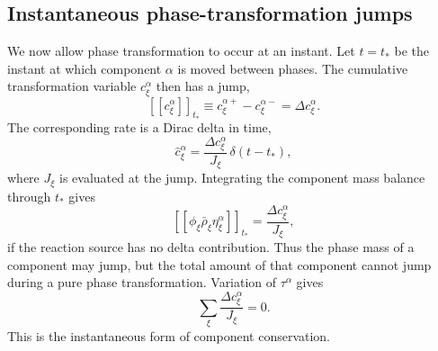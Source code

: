 \subsection{Instantaneous phase-transformation jumps}
\label{sec:instantaneous_c_jump}

We now allow phase transformation to occur at an instant.  Let $t=t_*$ be the
instant at which component $\alpha$ is moved between phases.  The cumulative
transformation variable $c_\xi^\alpha$ then has a jump,
\begin{equation}
  \left[\!\left[c_\xi^\alpha\right]\!\right]_{t_*}
  \equiv c_\xi^{\alpha +}-c_\xi^{\alpha -}
  = \Delta c_\xi^\alpha .
\end{equation}
The corresponding rate is a Dirac delta in time,
\begin{equation}
  \hat c_\xi^\alpha
  = \frac{\Delta c_\xi^\alpha}{J_\xi}\,\delta(t-t_*),
  \label{eq:chat_jump_decomp}
\end{equation}
where $J_\xi$ is evaluated at the jump.  Integrating the component mass balance
through $t_*$ gives
\begin{equation}
  \left[\!\left[\phi_\xi\bar\rho_\xi\eta_\xi^\alpha\right]\!\right]_{t_*}
  = \frac{\Delta c_\xi^\alpha}{J_\xi},
  \label{eq:phase_mass_jump_c}
\end{equation}
if the reaction source has no delta contribution.  Thus the phase mass of a
component may jump, but the total amount of that component cannot jump during a
pure phase transformation.  Variation of $\tau^\alpha$ gives
\begin{equation}
  \sum_\xi \frac{\Delta c_\xi^\alpha}{J_\xi}=0 .
  \label{eq:impulsive_transfer_constraint}
\end{equation}
This is the instantaneous form of component conservation.


